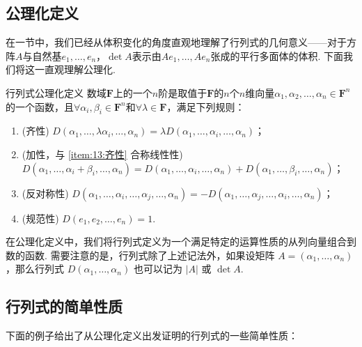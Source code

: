 \subsection{公理化定义}

在一节中，我们已经从体积变化的角度直观地理解了行列式的几何意义——对于方阵$A$与自然基$e_1,\ldots,e_n$，$\det A$表示由$Ae_1,\ldots,Ae_n$张成的平行多面体的体积. 下面我们将这一直观理解公理化.

\begin{definition}{行列式}{公理化定义}
    数域$\mathbf{F}$上的一个$n$阶是取值于$\mathbf{F}$的$n$个$n$维向量$\alpha_1,\alpha_2,\ldots,\alpha_n \in \mathbf{F}^n$的一个函数，且$\forall \alpha_i,\beta_i \in \mathbf{F}^n$和$\forall \lambda \in \mathbf{F}$，满足下列规则：
    \begin{enumerate}
        \item \label{item:13:齐性}
              (齐性) $D(\alpha_1,\ldots,\lambda\alpha_i,\ldots,\alpha_n)=\lambda D(\alpha_1,\ldots,\alpha_i,\ldots,\alpha_n)$；

        \item \label{item:13:加性}
              (加性，与 \ref*{item:13:齐性} 合称线性性) \\
              $D(\alpha_1,\ldots,\alpha_i+\beta_i,\ldots,\alpha_n)=D(\alpha_1,\ldots,\alpha_i,\ldots,\alpha_n)+D(\alpha_1,\ldots,\beta_i,\ldots,\alpha_n)$；

        \item \label{item:13:反对称性}
              (反对称性) $D(\alpha_1,\ldots,\alpha_i,\ldots,\alpha_j,\ldots,\alpha_n)=-D(\alpha_1,\ldots,\alpha_j,\ldots,\alpha_i,\ldots,\alpha_n)$；

        \item \label{item:13:规范性}
              (规范性) $D(e_1,e_2,\ldots,e_n)=1$.
    \end{enumerate}
\end{definition}

在公理化定义中，我们将行列式定义为一个满足特定的运算性质的从列向量组合到数的函数. 需要注意的是，行列式除了上述记法外，如果设矩阵 $A = (\alpha_1,\ldots,\alpha_n)$，那么行列式 $D(\alpha_1,\ldots,\alpha_n)$ 也可以记为 $|A|$ 或 $\det A$.

\subsection{行列式的简单性质}

下面的例子给出了从公理化定义出发证明的行列式的一些简单性质：

